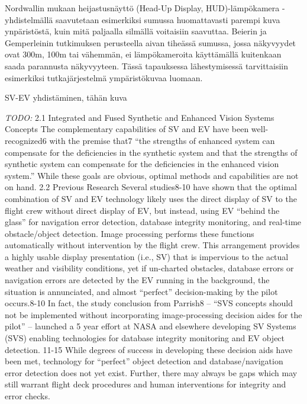 \documentclass[utf8,bachelor,manualbib]{gradu3}
\begin{document}
Nordwallin \citeyearpar{nordwall1993} mukaan heijastusnäyttö (Head-Up Display, HUD)-lämpökamera -yhdistelmällä saavutetaan esimerkiksi sumussa huomattavasti parempi kuva ynpäristöstä, kuin mitä paljaalla silmällä voitaisiin saavuttaa. Beierin ja Gemperleinin \citeyearpar{beiergemperlein2004} tutkimuksen perusteella aivan tiheässä sumussa, jossa näkyvyydet ovat 300m, 100m tai vähemmän, ei lämpökameroita käyttämällä kuitenkaan saada parannusta näkyvyyteen. Tässä tapauksessa lähestymisessä tarvittaisiin esimerkiksi tutkajärjestelmä ympäristökuvaa luomaan.

SV-EV yhdistäminen, tähän kuva \citep{mollersachs1994}

\emph{TODO:}
2.1 Integrated and Fused Synthetic and Enhanced Vision Systems Concepts
The complementary capabilities of SV and EV have been well-recognized6 with the premise that7 “the
strengths of enhanced system can compensate for the deficiencies in the synthetic system and that the
strengths of synthetic system can compensate for the deficiencies in the enhanced vision system.” While
these goals are obvious, optimal methods and capabilities are not on hand.
2.2 Previous Research
Several studies8-10 have shown that the optimal combination of SV and EV technology likely uses the direct
display of SV to the flight crew without direct display of EV, but instead, using EV “behind the glass” for
navigation error detection, database integrity monitoring, and real-time obstacle/object detection. Image
processing performs these functions automatically without intervention by the flight crew. This arrangement
provides a highly usable display presentation (i.e., SV) that is impervious to the actual weather and visibility
conditions, yet if un-charted obstacles, database errors or navigation errors are detected by the EV running in
the background, the situation is annunciated, and almost “perfect” decision-making by the pilot occurs.8-10 In
fact, the study conclusion from Parrish8 – “SVS concepts should not be implemented without incorporating
image-processing decision aides for the pilot” – launched a 5 year effort at NASA and elsewhere developing
SV Systems (SVS) enabling technologies for database integrity monitoring and EV object detection. 11-15
While degrees of success in developing these decision aids have been met, technology for “perfect” object
detection and database/navigation error detection does not yet exist. Further, there may always be gaps which
may still warrant flight deck procedures and human interventions for integrity and error checks.
\citep{baileyym2007}
\end{document}
